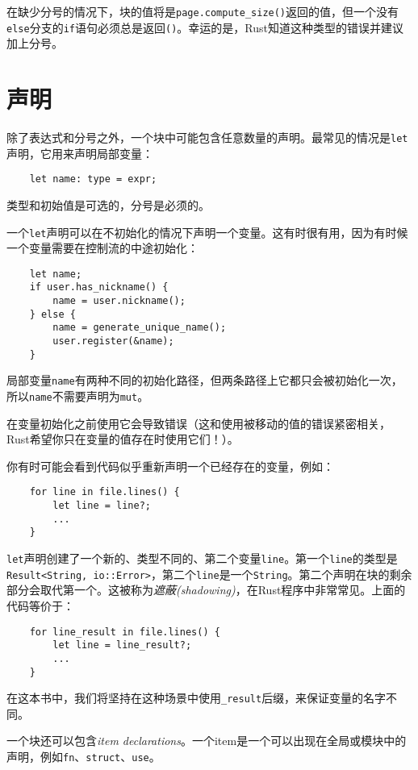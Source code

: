在缺少分号的情况下，块的值将是\texttt{page.compute\_size()}返回的值，但一个没有\texttt{else}分支的\texttt{if}语句必须总是返回\texttt{()}。幸运的是，Rust知道这种类型的错误并建议加上分号。

\section{声明}

除了表达式和分号之外，一个块中可能包含任意数量的声明。最常见的情况是\texttt{let}声明，它用来声明局部变量：
\begin{verbatim}
    let name: type = expr;
\end{verbatim}

类型和初始值是可选的，分号是必须的。

一个\texttt{let}声明可以在不初始化的情况下声明一个变量。这有时很有用，因为有时候一个变量需要在控制流的中途初始化：
\begin{verbatim}
    let name;
    if user.has_nickname() {
        name = user.nickname();
    } else {
        name = generate_unique_name();
        user.register(&name);
    }
\end{verbatim}

局部变量\texttt{name}有两种不同的初始化路径，但两条路径上它都只会被初始化一次，所以\texttt{name}不需要声明为\texttt{mut}。

在变量初始化之前使用它会导致错误（这和使用被移动的值的错误紧密相关，Rust希望你只在变量的值存在时使用它们！）。

你有时可能会看到代码似乎重新声明一个已经存在的变量，例如：
\begin{verbatim}
    for line in file.lines() {
        let line = line?;
        ...
    }
\end{verbatim}

\texttt{let}声明创建了一个新的、类型不同的、第二个变量\texttt{line}。第一个\texttt{line}的类型是\texttt{Result<String, io::Error>}，第二个\texttt{line}是一个\texttt{String}。第二个声明在块的剩余部分会取代第一个。这被称为\emph{遮蔽(shadowing)}，在Rust程序中非常常见。上面的代码等价于：
\begin{verbatim}
    for line_result in file.lines() {
        let line = line_result?;
        ...
    }
\end{verbatim}

在这本书中，我们将坚持在这种场景中使用\texttt{\_result}后缀，来保证变量的名字不同。

一个块还可以包含\emph{item declarations}。一个item是一个可以出现在全局或模块中的声明，例如\texttt{fn}、\texttt{struct}、\texttt{use}。

